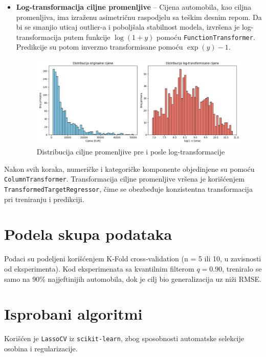 \documentclass[a4paper,12pt]{article}
\begin{document}
\begin{itemize}
    \item \textbf{Log-transformacija ciljne promenljive} – Cijena automobila, kao ciljna promenljiva, ima izraženu asimetričnu raspodjelu sa teškim desnim repom. Da bi se smanjio uticaj outlier-a i poboljšala stabilnost modela, izvršena je log-transformacija putem funkcije $\log(1 + y)$ pomoću \texttt{FunctionTransformer}. Predikcije su potom inverzno transformisane pomoću $\exp(y) - 1$.
	\begin{figure}[H]
	    \centering
	    \includegraphics[width=\textwidth]{log_transformacija_cena.png}
	    \caption{Distribucija ciljne promenljive pre i posle log-transformacije}
	    \label{fig:log_transform}
	\end{figure}
\end{itemize}

Nakon svih koraka, numeričke i kategoričke komponente objedinjene su pomoću \texttt{ColumnTransformer}. Transformacija ciljne promenljive vršena je korišćenjem \texttt{TransformedTargetRegressor}, čime se obezbeđuje konzistentna transformacija pri treniranju i predikciji.

\section{Podela skupa podataka}

Podaci su podeljeni korišćenjem K-Fold cross-validation (n = 5 ili 10, u zavisnosti od eksperimenta). Kod eksperimenata sa kvantilnim filterom $q=0.90$, treniralo se samo na 90\% najjeftinijih automobila, dok je cilj bio generalizacija uz niži RMSE.

\section{Isprobani algoritmi}

Korišćen je \texttt{LassoCV} iz \texttt{scikit-learn}, zbog sposobnosti automatske selekcije osobina i regularizacije.
\end{document}

